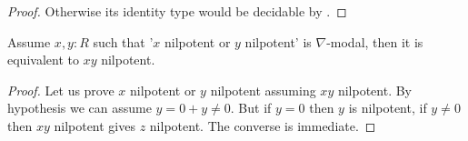 \begin{proof}
Otherwise its identity type would be decidable by .
\end{proof}

\begin{lemma}
Assume $x,y:R$ such that '$x$ nilpotent or $y$ nilpotent' is $\nabla$-modal, then it is equivalent to $xy$ nilpotent.
\end{lemma}

\begin{proof}
Let us prove $x$ nilpotent or $y$ nilpotent assuming $xy$ nilpotent. By hypothesis we can assume $y=0+y\not=0$. But if $y=0$ then $y$ is nilpotent, if $y\not=0$ then $xy$ nilpotent gives $z$ nilpotent. The converse is immediate.
\end{proof}